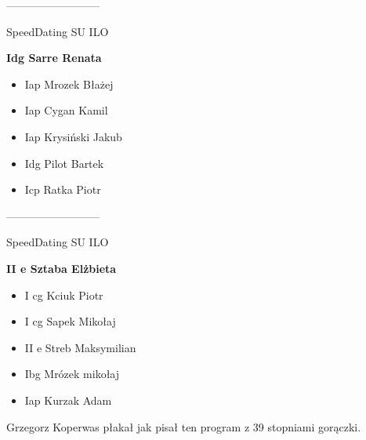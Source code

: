 \documentclass[a4paper,10pt]{article}
\begin{document}
\begin{multicols}{3}
\begin{minipage}[l]{\textwidth}
\end{minipage}



\begin{minipage}[l]{\textwidth}
--------------------------

  \footnotesize{SpeedDating SU ILO}

  \bfseries{Idg Sarre Renata}

  \begin{itemize}
    \item Iap Mrozek Błażej
    \item Iap Cygan Kamil
    \item Iap Krysiński Jakub
    \item Idg Pilot Bartek
    \item Icp Ratka Piotr

    \end{itemize}



\end{minipage}



\begin{minipage}[l]{\textwidth}
--------------------------

  \footnotesize{SpeedDating SU ILO}

  \bfseries{II e Sztaba Elżbieta}

  \begin{itemize}
    \item I cg Kciuk Piotr
    \item I cg Sapek Mikołaj
    \item II e Streb Maksymilian
    \item Ibg Mrózek mikołaj
    \item Iap Kurzak Adam

    \end{itemize}



\end{minipage}

\end{multicols}

Grzegorz Koperwas płakał jak pisał ten program z 39 stopniami gorączki.
\end{document}
